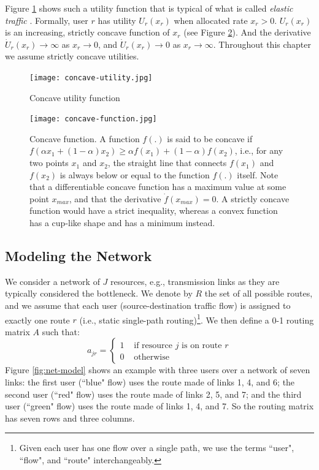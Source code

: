 \documentclass{article}
\begin{document}
Figure \ref{fig:concave-utility} shows such a utility function that is typical of what is called 
{\em elastic traffic} \cite{elastic:2006}. 
Formally, user $r$ has utility $U_r(x_r)$ when allocated rate $x_r > 0$. 
$U_r(x_r)$ is an increasing, strictly concave function of $x_r$ (see Figure \ref{fig:concave-function}).
And the derivative $\dot{U}_r(x_r) \rightarrow \infty$ as $x_r \rightarrow 0$,
and  $\dot{U}_r(x_r) \rightarrow 0$ as $x_r \rightarrow \infty$.
Throughout this chapter we assume strictly concave utilities.

\begin{figure}[htbp] %
   \centering
   \texttt{[image: concave-utility.jpg]} 
   \caption{Concave utility function}
   \label{fig:concave-utility}
\end{figure}

\begin{figure}[htbp] %
   \centering
   \texttt{[image: concave-function.jpg]} 
   \caption{Concave function. 
   A function $f(.)$ is said to be concave if $f(\alpha x_1 + (1-\alpha)x_2) \geq \alpha f(x_1) + (1-\alpha) f(x_2)$,
   i.e., for any two points $x_1$ and $x_2$, the straight line  that connects $f(x_1)$ and $f(x_2)$ is always below
   or equal to the function $f(.)$ itself. 
   Note that a differentiable concave function has a maximum value at some point $x_{max}$, and 
   that the derivative $\dot{f}(x_{max}) = 0.$
   A strictly concave function would have a strict inequality, whereas a convex function has a cup-like shape and
    has a minimum instead.}
   \label{fig:concave-function}
\end{figure}

\subsection{Modeling the Network}

We consider a network of $J$ resources, e.g., transmission links as they are typically considered the bottleneck. 
We denote by $R$ the set of all possible routes, and we assume that each user (source-destination traffic flow) is assigned to exactly one route $r$ (i.e., static single-path routing)\footnote{Given each user has one flow over a single path, we use the terms ``user", ``flow", and ``route" interchangeably.}.
We then define a 0-1 routing matrix $A$ such that:
$$
a_{jr} = \left\{ \begin{array}{rl} 
              1 & \mbox{ if resource $j$ is on route $r$} \\
              0 & \mbox{ otherwise}
              \end{array} \right.
$$
Figure \ref{fig:net-model} shows an example with three users  over a network of seven links: 
the first user (``blue" flow) uses the route made of links 1, 4, and 6;
the second user (``red" flow) uses the route made of links 2, 5, and 7;
and the third user (``green" flow) uses the route made of links 1, 4, and 7.
So the routing matrix has seven rows and three columns.
\end{document}
